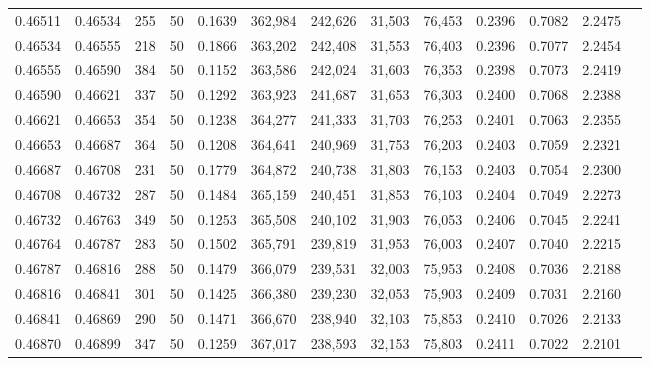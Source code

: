 \begin{tabular}{rrrrrrrrrrrrr}
0.46511 & 0.46534 &   255 &  50 &                                     0.1639 & 362,984 & 242,626 &  31,503 &  76,453 & 0.2396 & 0.7082 & 2.2475 \\
0.46534 & 0.46555 &   218 &  50 &                                     0.1866 & 363,202 & 242,408 &  31,553 &  76,403 & 0.2396 & 0.7077 & 2.2454 \\
0.46555 & 0.46590 &   384 &  50 &                                     0.1152 & 363,586 & 242,024 &  31,603 &  76,353 & 0.2398 & 0.7073 & 2.2419 \\
0.46590 & 0.46621 &   337 &  50 &                                     0.1292 & 363,923 & 241,687 &  31,653 &  76,303 & 0.2400 & 0.7068 & 2.2388 \\
0.46621 & 0.46653 &   354 &  50 &                                     0.1238 & 364,277 & 241,333 &  31,703 &  76,253 & 0.2401 & 0.7063 & 2.2355 \\
0.46653 & 0.46687 &   364 &  50 &                                     0.1208 & 364,641 & 240,969 &  31,753 &  76,203 & 0.2403 & 0.7059 & 2.2321 \\
0.46687 & 0.46708 &   231 &  50 &                                     0.1779 & 364,872 & 240,738 &  31,803 &  76,153 & 0.2403 & 0.7054 & 2.2300 \\
0.46708 & 0.46732 &   287 &  50 &                                     0.1484 & 365,159 & 240,451 &  31,853 &  76,103 & 0.2404 & 0.7049 & 2.2273 \\
0.46732 & 0.46763 &   349 &  50 &                                     0.1253 & 365,508 & 240,102 &  31,903 &  76,053 & 0.2406 & 0.7045 & 2.2241 \\
0.46764 & 0.46787 &   283 &  50 &                                     0.1502 & 365,791 & 239,819 &  31,953 &  76,003 & 0.2407 & 0.7040 & 2.2215 \\
0.46787 & 0.46816 &   288 &  50 &                                     0.1479 & 366,079 & 239,531 &  32,003 &  75,953 & 0.2408 & 0.7036 & 2.2188 \\
0.46816 & 0.46841 &   301 &  50 &                                     0.1425 & 366,380 & 239,230 &  32,053 &  75,903 & 0.2409 & 0.7031 & 2.2160 \\
0.46841 & 0.46869 &   290 &  50 &                                     0.1471 & 366,670 & 238,940 &  32,103 &  75,853 & 0.2410 & 0.7026 & 2.2133 \\
0.46870 & 0.46899 &   347 &  50 &                                     0.1259 & 367,017 & 238,593 &  32,153 &  75,803 & 0.2411 & 0.7022 & 2.2101 \\

\end{tabular}
